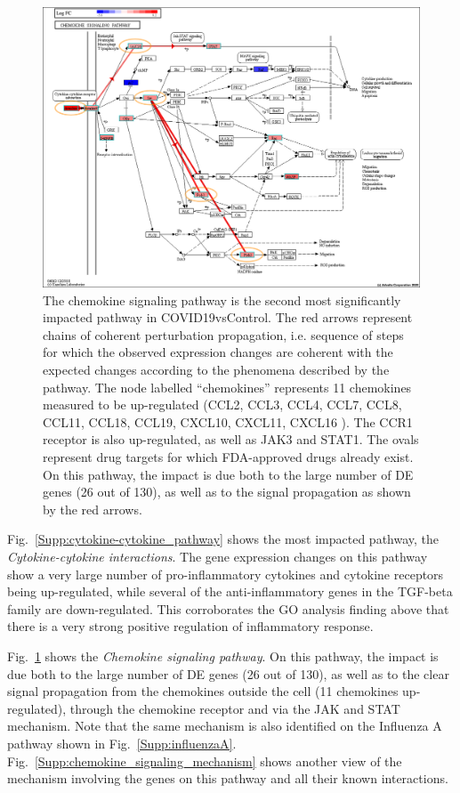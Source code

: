 \begin{figure}
\centering
	\includegraphics[width=0.9\linewidth]{../Figures/Chemokine_signaling_pathway.png}
    \caption{ The chemokine signaling pathway is the second most significantly impacted pathway in COVID19vsControl. The red arrows represent chains of coherent perturbation propagation, i.e. sequence of steps for which the observed expression changes are coherent with the expected changes according to the phenomena described by the pathway. The node labelled ``chemokines'' represents 11 chemokines measured to be up-regulated (CCL2, CCL3, CCL4, CCL7, CCL8, CCL11,  CCL18, CCL19, CXCL10, CXCL11, CXCL16 ). The CCR1 receptor is also up-regulated, as well as  JAK3 and STAT1. The ovals represent drug targets for which FDA-approved drugs already exist. 
    On this pathway, the impact is due both to the large number of DE genes  (26 out of 130), as well as to the signal propagation as shown by the red arrows. }
        \label{Supp:drugs_on_chemokine_signaling}
\end{figure}

Fig.~\ref{Supp:cytokine-cytokine_pathway} shows the most impacted pathway, the \emph{Cytokine-cytokine interactions}. 
The gene expression changes on this pathway  show a very large number of pro-inflammatory cytokines and cytokine receptors being up-regulated, while several of the anti-inflammatory genes in the TGF-beta family are down-regulated. This corroborates the GO analysis finding above that there is a very strong positive regulation of inflammatory response. 
\color{black}



Fig.~\ref{Supp:drugs_on_chemokine_signaling} shows the \emph{Chemokine signaling pathway}.  
On this pathway, the impact is due both to the large number of DE genes (26 out of 130), as well as to the clear signal propagation from the chemokines outside the cell (11 chemokines up-regulated), through the chemokine receptor and via the JAK and STAT mechanism. 
Note that the same mechanism is also identified on the Influenza A pathway shown in Fig.~\ref{Supp:influenzaA}. \color{black}
Fig.~\ref{Supp:chemokine_signaling_mechanism} shows another view of the mechanism involving the genes on this pathway and all their known interactions.

